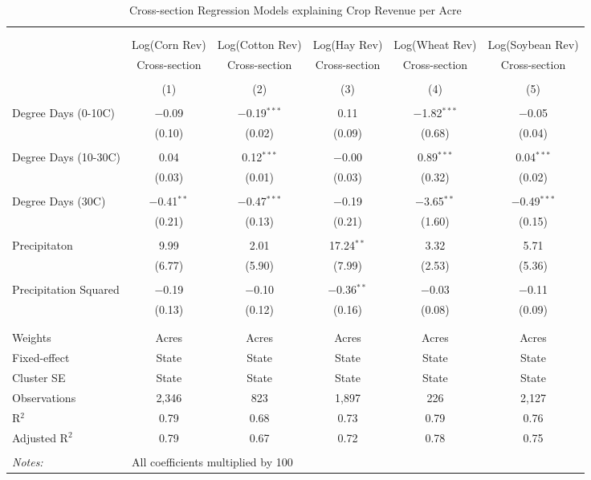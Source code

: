 \documentclass[10pt]{article}
\begin{document}
\begin{table}[!htbp] \centering 
  \caption{Cross-section Regression Models explaining Crop Revenue per Acre} 
  \label{} 
\footnotesize 
\begin{tabular}{@{\extracolsep{5pt}}lccccc} 
\\[-1.8ex]\hline 
\hline \\[-1.8ex] 
\\[-1.8ex] & Log(Corn Rev) & Log(Cotton Rev) & Log(Hay Rev) & Log(Wheat Rev) & Log(Soybean Rev) \\ 
 & Cross-section & Cross-section & Cross-section & Cross-section & Cross-section \\ 
\\[-1.8ex] & (1) & (2) & (3) & (4) & (5)\\ 
\hline \\[-1.8ex] 
 Degree Days (0-10C) & $-$0.09 & $-$0.19$^{***}$ & 0.11 & $-$1.82$^{***}$ & $-$0.05 \\ 
  & (0.10) & (0.02) & (0.09) & (0.68) & (0.04) \\ 
  & & & & & \\ 
 Degree Days (10-30C) & 0.04 & 0.12$^{***}$ & $-$0.00 & 0.89$^{***}$ & 0.04$^{***}$ \\ 
  & (0.03) & (0.01) & (0.03) & (0.32) & (0.02) \\ 
  & & & & & \\ 
 Degree Days (30C) & $-$0.41$^{**}$ & $-$0.47$^{***}$ & $-$0.19 & $-$3.65$^{**}$ & $-$0.49$^{***}$ \\ 
  & (0.21) & (0.13) & (0.21) & (1.60) & (0.15) \\ 
  & & & & & \\ 
 Precipitaton & 9.99 & 2.01 & 17.24$^{**}$ & 3.32 & 5.71 \\ 
  & (6.77) & (5.90) & (7.99) & (2.53) & (5.36) \\ 
  & & & & & \\ 
 Precipitation Squared & $-$0.19 & $-$0.10 & $-$0.36$^{**}$ & $-$0.03 & $-$0.11 \\ 
  & (0.13) & (0.12) & (0.16) & (0.08) & (0.09) \\ 
  & & & & & \\ 
\hline \\[-1.8ex] 
Weights & Acres & Acres & Acres & Acres & Acres \\ 
Fixed-effect & State & State & State & State & State \\ 
Cluster SE & State & State & State & State & State \\ 
Observations & 2,346 & 823 & 1,897 & 226 & 2,127 \\ 
R$^{2}$ & 0.79 & 0.68 & 0.73 & 0.79 & 0.76 \\ 
Adjusted R$^{2}$ & 0.79 & 0.67 & 0.72 & 0.78 & 0.75 \\ 
\hline 
\hline \\[-1.8ex] 
\textit{Notes:} & \multicolumn{5}{l}{All coefficients multiplied by 100} \\ 
\end{tabular} 
\end{table} 
\end{document}
